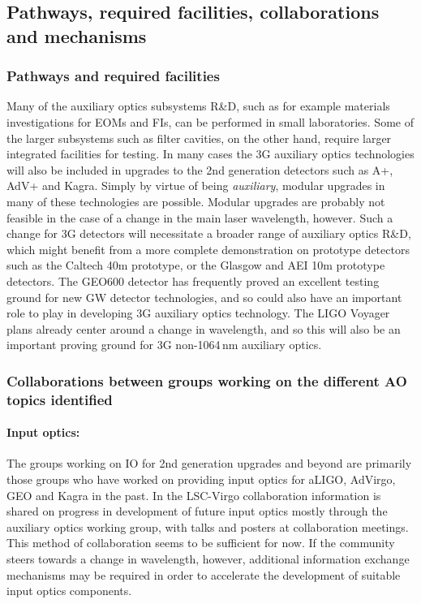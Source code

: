 \subsection{Pathways, required facilities, collaborations and mechanisms}
\subsubsection{Pathways and required facilities}
Many of the auxiliary optics subsystems R\&D, such as for example materials investigations for EOMs and FIs, can be performed in small laboratories. 
Some of the larger subsystems such as filter cavities, on the other hand, require larger integrated facilities for testing. In many cases the 3G auxiliary optics technologies will also be included in upgrades to the 2nd generation detectors such as A+, AdV+ and Kagra. Simply by virtue of being \emph{auxiliary}, modular upgrades in many of these technologies are possible. Modular upgrades are probably not feasible in the case of a change in the main laser wavelength, however. Such a change for 3G detectors will necessitate a broader range of auxiliary optics R\&D, which might benefit from a more complete demonstration on prototype detectors such as the Caltech 40m prototype, or the Glasgow and AEI 10m prototype detectors. The GEO600 detector has frequently proved an excellent testing ground for new GW detector technologies, and so could also have an important role to play in developing 3G auxiliary optics technology. The LIGO Voyager plans already center around a change in wavelength, and so this will also be an important proving ground for 3G non-1064\,nm auxiliary optics.

\subsubsection{Collaborations between groups working on the different AO topics identified}
\paragraph{\bf Input optics:} The groups working on IO for 2nd generation upgrades and beyond are primarily those groups who have worked on providing input optics for aLIGO, AdVirgo, GEO and Kagra in the past. In the LSC-Virgo collaboration information is shared on progress in development of future input optics mostly through the auxiliary optics working group, with talks and posters at collaboration meetings. This method of collaboration seems to be sufficient for now. If the community steers towards a change in wavelength, however, additional information exchange mechanisms may be required in order to accelerate the development of suitable input optics components.

